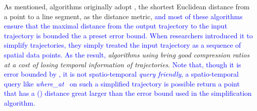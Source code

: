 As mentioned, \lsa algorithms originally adopt \ped, {the shortest Euclidean distance from a point to a line segment, as the distance metric, \textcolor{blue}{and most of these algorithms ensure that the maximal distance from the output trajectory to the input trajectory is bounded the a preset \ped error bound. When researchers introduced it to simplify trajectories, they simply treated the input trajectory as a sequence of spatial data points. As the result,} \emph{\lsa algorithms using \ped bring good compression ratios~\cite{Douglas:Peucker, Hershberger:Speeding, Liu:BQS, Muckell:Compression, Chen:Trajectory, Cao:Spatio, Shi:Survey} at a cost of losing temporal information of trajectories}.} \textcolor{blue}{Note that, though it is error bounded by \ped, it is not spatio-temporal \emph{query friendly}, \ie a spatio-temporal query like \emph{where\_at}~\cite{Cao:Spatio} on such a simplified trajectory is possible return a point that has a (\sed) distance great larger than the \ped error bound used in the simplification algorithm.}

